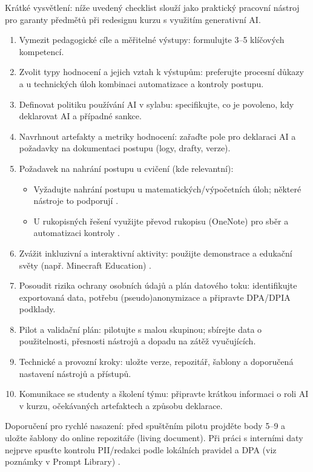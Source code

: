 Krátké vysvětlení: níže uvedený checklist slouží jako praktický pracovní nástroj pro garanty předmětů při redesignu kurzu s využitím generativní AI.

\begin{enumerate}
  \item[1.] [\ ] Vymezit pedagogické cíle a měřitelné výstupy: formulujte 3–5 klíčových kompetencí.
  \item[2.] [\ ] Zvolit typy hodnocení a jejich vztah k výstupům: preferujte procesní důkazy a u technických úloh kombinaci automatizace a kontroly postupu.
  \item[3.] [\ ] Definovat politiku používání AI v sylabu: specifikujte, co je povoleno, kdy deklarovat AI a případné sankce.
  \item[4.] [\ ] Navrhnout artefakty a metriky hodnocení: zařaďte pole pro deklaraci AI a požadavky na dokumentaci postupu (logy, drafty, verze).
  \item[5.] [\ ] Požadavek na nahrání postupu u cvičení (kde relevantní):
    \begin{itemize}
      \item Vyžadujte nahrání postupu u matematických/výpočetních úloh; některé nástroje to podporují \cite{kb_ai_101_tipu_pdf_04e4a115_page_8_1}.
      \item U rukopisných řešení využijte převod rukopisu (OneNote) pro sběr a automatizaci kontroly \cite{kb_ai_101_tipu_pdf_04e4a115_page_8_1}.
    \end{itemize}
  \item[6.] [\ ] Zvážit inkluzivní a interaktivní aktivity: použijte demonstrace a edukační světy (např. Minecraft Education) \cite{kb_ai_101_tipu_pdf_04e4a115_page_15_2}.
  \item[7.] [\ ] Posoudit rizika ochrany osobních údajů a plán datového toku: identifikujte exportovaná data, potřebu (pseudo)anonymizace a připravte DPA/DPIA podklady.
  \item[8.] [\ ] Pilot a validační plán: pilotujte s malou skupinou; sbírejte data o použitelnosti, přesnosti nástrojů a dopadu na zátěž vyučujících.
  \item[9.] [\ ] Technické a provozní kroky: uložte verze, repozitář, šablony a doporučená nastavení nástrojů a přístupů.
  \item[10.] [\ ] Komunikace se studenty a školení týmu: připravte krátkou informaci o roli AI v kurzu, očekávaných artefaktech a způsobu deklarace.
\end{enumerate}

Doporučení pro rychlé nasazení: před spuštěním pilotu projděte body 5–9 a uložte šablony do online repozitáře (living document). Při práci s interními daty nejprve spusťte kontrolu PII/redakci podle lokálních pravidel a DPA (viz poznámky v Prompt Library) \cite{kb_ai_101_tipu_pdf_04e4a115_page_15_2,kb_ai_101_tipu_pdf_04e4a115_page_8_1}.